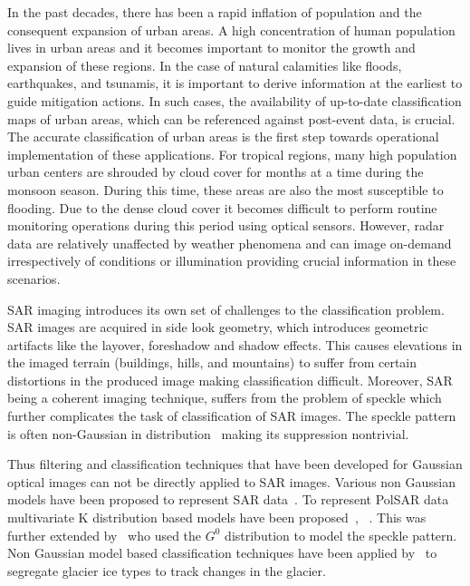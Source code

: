 In the past decades, there has been a rapid inflation of population and the consequent expansion of urban areas. A high concentration of human population lives in urban areas and it becomes important to monitor the growth and expansion of these regions. In the case of natural calamities like floods, earthquakes, and tsunamis, it is important to derive information at the earliest to guide mitigation actions. In such cases, the availability of up-to-date  classification maps of urban areas, which can be referenced against post-event data, is crucial. The accurate classification of urban areas is the first step towards operational implementation of these applications.
For tropical regions, many high population urban centers are shrouded by cloud cover for months at a time during the monsoon season. During this time, these areas are also the most susceptible to flooding.  Due to the dense cloud cover it becomes difficult to perform routine monitoring operations during this period using optical sensors. However, radar data are relatively unaffected by weather phenomena and can image on-demand irrespectively of conditions or illumination providing crucial information in these scenarios. 



SAR imaging introduces its own set of challenges to the classification problem. SAR images are acquired in side look geometry, which introduces geometric artifacts like the layover, foreshadow and shadow effects. This causes elevations in the imaged terrain (buildings, hills, and mountains) to suffer from certain distortions in the produced image making classification difficult. Moreover, SAR being a coherent imaging technique, suffers from the problem of speckle which further complicates the task of classification of SAR images. The speckle pattern is often non-Gaussian in distribution~\cite{jakeman1976model} making its suppression nontrivial. 

Thus filtering and classification techniques that have been developed for Gaussian optical images can not be directly applied to SAR images. Various non Gaussian models have been proposed to represent SAR data~\cite{jakeman1976model}. To represent PolSAR data multivariate K distribution based models have been proposed~\cite{lee1994k}, ~\cite{doulgeris2010scale}. This was further extended by~\cite{freitas2005polarimetric} who used the $G^0$ distribution to model the speckle pattern. Non Gaussian model based classification techniques have been applied by~\cite{akbari2010non} to segregate glacier ice types to track changes in the glacier.  


